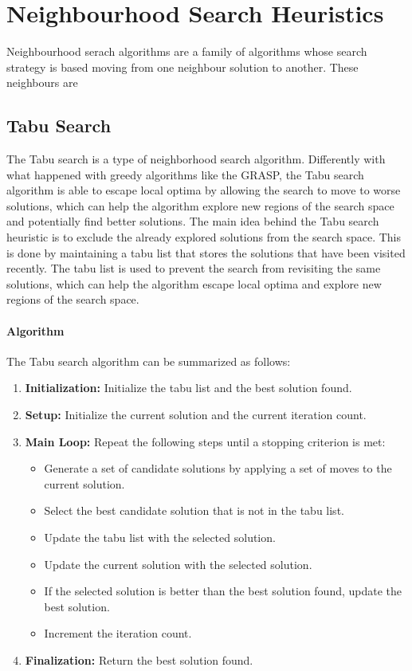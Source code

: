 \documentclass{article}
\begin{document}
\newpage

\section{Neighbourhood Search Heuristics}
Neighbourhood serach algorithms are a family of algorithms whose search strategy is based moving from one neighbour solution to another. These neighbours are 

\subsection{Tabu Search}
The Tabu search is a type of neighborhood search algorithm. 
Differently with what happened with greedy algorithms like the GRASP, the Tabu search algorithm is able to escape local optima by allowing the search to move to worse solutions,
which can help the algorithm explore new regions of the search space and potentially find better solutions.
The main idea behind the Tabu search heuristic is to exclude the already explored solutions from the search space. 
This is done by maintaining a tabu list that stores the solutions that have been visited recently. 
The tabu list is used to prevent the search from revisiting the same solutions, 
which can help the algorithm escape local optima and explore new regions of the search space\cite{Heuristics_for_the_Traveling_Salesman_Problem}.

\paragraph{Algorithm}
The Tabu search algorithm can be summarized as follows:
\begin{enumerate}
    \item \textbf{Initialization:} Initialize the tabu list and the best solution found.
    \item \textbf{Setup:} Initialize the current solution and the current iteration count.
    \item \textbf{Main Loop:} Repeat the following steps until a stopping criterion is met:
          \begin{itemize}
              \item Generate a set of candidate solutions by applying a set of moves to the current solution.
              \item Select the best candidate solution that is not in the tabu list.
              \item Update the tabu list with the selected solution.
              \item Update the current solution with the selected solution.
              \item If the selected solution is better than the best solution found, update the best solution.
              \item Increment the iteration count.
          \end{itemize}
    \item \textbf{Finalization:} Return the best solution found.
\end{enumerate}
\end{document}
